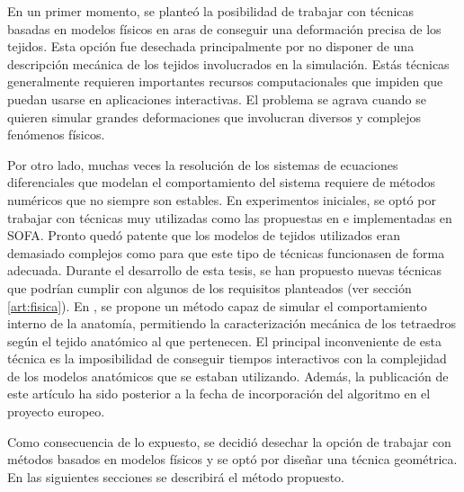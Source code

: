 En un primer momento, se planteó la posibilidad de trabajar con técnicas basadas en modelos físicos en aras de conseguir una deformación precisa de los tejidos. Esta opción fue desechada principalmente por no disponer de una descripción mecánica de los tejidos involucrados en la simulación. Estás técnicas generalmente requieren importantes recursos computacionales que impiden que puedan usarse en aplicaciones interactivas. El problema se agrava cuando se quieren simular grandes deformaciones que involucran diversos y complejos fenómenos físicos.

Por otro lado, muchas veces la resolución de los sistemas de ecuaciones diferenciales que modelan el comportamiento del sistema requiere de métodos numéricos que no siempre son estables. En experimentos iniciales, se optó por trabajar con técnicas muy utilizadas como las propuestas en  \cite{Muller2004} e implementadas en \ac{SOFA}. Pronto quedó patente que los modelos de tejidos utilizados eran demasiado complejos como para que este tipo de técnicas funcionasen de forma adecuada.
Durante el desarrollo de esta tesis, se han propuesto nuevas técnicas que podrían cumplir con algunos de los requisitos planteados (ver sección \ref{art:fisica}). En \cite{abu2015position}, se propone un método capaz de simular el comportamiento interno de la anatomía, permitiendo la caracterización mecánica de los tetraedros según el tejido anatómico al que pertenecen.  
El principal inconveniente de esta técnica es la imposibilidad de conseguir tiempos interactivos con la complejidad de los modelos anatómicos que se estaban utilizando. Además, la publicación de este artículo ha sido posterior a la fecha de incorporación del algoritmo en el proyecto europeo.

Como consecuencia de lo expuesto, se decidió desechar la opción de trabajar con métodos basados en modelos físicos y se optó por diseñar una técnica geométrica. En las siguientes secciones se describirá el método propuesto.